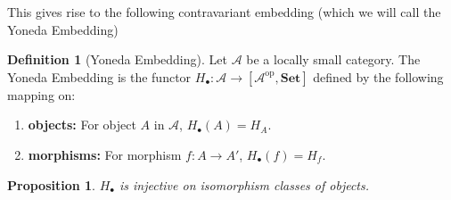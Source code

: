 \documentclass[11pt]{article}
\theoremstyle{definition}
\newtheorem*{defn}{Definition}
\theoremstyle{definition}
\theoremstyle{plain}
\theoremstyle{plain}
\newtheorem{prop}{Proposition}
\theoremstyle{plain}
\begin{document}
This gives rise to the following contravariant embedding (which we will call the Yoneda Embedding)

\begin{defn}[Yoneda Embedding]
Let $\mathscr{A}$ be a locally small category. The Yoneda Embedding is the functor $H_{\bullet}:\mathscr{A} \to [\mathscr{A}^{\text{op}},\textbf{Set}]$ defined by the following mapping on:

\begin{enumerate}
\item \textbf{objects: } For object $A$ in $\mathscr{A}$, $H_{\bullet}(A) = H_A$.
\item \textbf{morphisms: } For morphism $f: A \to A'$, $H_{\bullet}(f) = H_f$.
\end{enumerate}
\end{defn}

\begin{prop}
$H_{\bullet}$ is injective on isomorphism classes of objects.
\end{prop}
\end{document}

